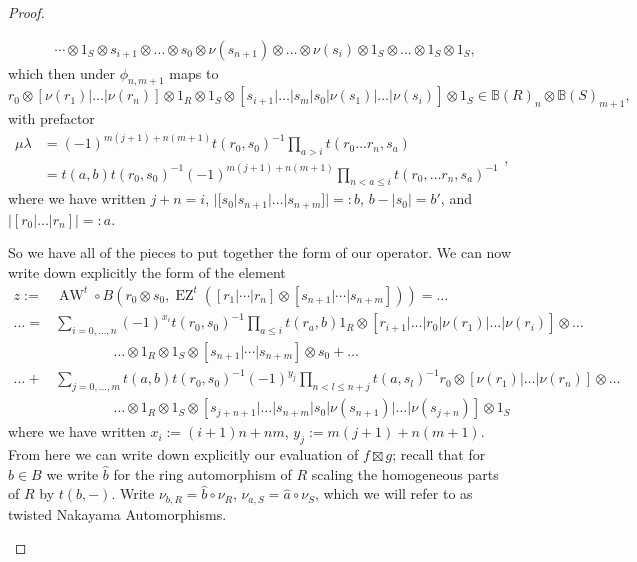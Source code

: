\documentclass{article}
\makeatletter
\newcommand{\ten}{\otimes}
\newcommand{\awt}{\operatorname{AW}^t}
\newcommand{\ezt}{\operatorname{EZ}^t}
\newcommand{\elr}{[r_1 | \cdots | r_n]}
\newcommand{\els}{[s_{n+1} | \cdots |s_{n+m}]}
\theoremstyle{plain}
\theoremstyle{definition}
\def\namedlabel#1#2{\begingroup
    #2%
    \def\@currentlabel{#2}%
    \phantomsection\label{#1}\endgroup 
}
\makeatother
\begin{document}
\begin{proof}
\begin{pfparts}
$$\begin{aligned}
&\cdots \otimes 1_S \otimes s_{i+1} \otimes \ldots \otimes s_0 \otimes \nu(s_{n+1}) \otimes \ldots \otimes \nu(s_{i}) \otimes 1_S \otimes \ldots \otimes 1_S \otimes 1_S,
\end{aligned}$$
which then under $\phi_{n,m+1}$ maps to
$$r_0 \otimes [\nu(r_1) | \ldots | \nu(r_n) ] \otimes 1_R \otimes 1_S \otimes [s_{i+1} | \ldots | s_m | s_0 | \nu(s_1) | \ldots | \nu(s_{i}) ] \otimes 1_S\in \mathbb{B}(R)_{n} \otimes \mathbb{B}(S)_{m+1},$$
with prefactor $$\begin{aligned}\mu\lambda& = (-1)^{m(j+1) +n(m+1)}t(r_0,s_0)^{-1}\prod_{a> i} t(r_0 \ldots r_n, s_a) \\
&= t(a,b)t(r_0,s_0)^{-1} (-1)^{m(j+1) +n(m+1)}\prod_{n < a \leq i}t(r_0, \ldots r_n, s_a)^{-1}\end{aligned},$$
where we have written $j+n=i$, $|[s_0 | s_{n+1} | \ldots | s_{n+m}]| =: b$, $b-|s_0|=b'$, and $|[r_0 | \ldots | r_n]| =: a$.
\item[\namedlabel{pfpart:bvoperator}{The Form of the $\operatorname{BV}$-operator.}]
So we have all of the pieces to put together the form of our operator. We can now write down explicitly the form of the element
$$\begin{aligned} 
z:=& \awt \circ B(r_0 \otimes s_0, \ezt (\elr \ten \els))= \ldots  \\
\ldots= &\sum_{i=0, \ldots, n} (-1)^{x_i}t(r_0,s_0)^{-1}\prod_{a\leq i} t(r_a, b) 1_R \otimes [r_{i+1} | \ldots | r_0 | \nu(r_1) | \ldots | \nu(r_i) ] \otimes \ldots \\
&\hspace{50pt}\ldots \otimes 1_R \otimes 1_S \otimes \els \otimes s_0 + \ldots \\
\ldots+&\sum_{j=0, \ldots, m} t(a,b)t(r_0,s_0)^{-1} (-1)^{y_j}\prod_{n < l \leq n+j} t(a, s_l)^{-1} r_0 \otimes [\nu(r_1) | \ldots | \nu(r_n) ]  \otimes \ldots\\ &\hspace{50pt}\ldots \otimes 1_R \otimes 1_S \otimes [s_{j+n+1} | \ldots | s_{n+m} | s_0 | \nu(s_{n+1}) | \ldots | \nu(s_{j+n}) ] \otimes 1_S
\end{aligned}$$
where we have written $x_i := (i+1)n + nm$, $y_j := m(j+1) +n(m+1)$. From here we can write down explicitly our evaluation of $f \boxtimes g$; recall that for $b \in B$ we write $\hat{b}$ for the ring automorphism of $R$ scaling the homogeneous parts of $R$ by $t(b,-)$. Write $\nu_{b,R} = \hat{b} \circ \nu_R$, $\nu_{a,S} = \hat{a} \circ \nu_S$, which we will refer to as twisted Nakayama Automorphisms. \\[5pt]

\end{pfparts}
\end{proof}
\end{document}
